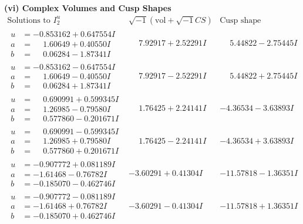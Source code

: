 \documentclass[1p]{elsarticle_modified}
\theoremstyle{definition}
\newcommand{\I}{\sqrt{-1}}
\begin{document}
\newpage\flushleft \textbf{(vi) Complex Volumes and Cusp Shapes}
$$\begin{array}{c|c|c}  
\text{Solutions to }I^u_{2}& \I (\text{vol} + \sqrt{-1}CS) & \text{Cusp shape}\\
 \hline 
\begin{aligned}
u &= -0.853162 + 0.647554 I \\
a &= \phantom{-}1.60649 + 0.40550 I \\
b &= \phantom{-}0.06284 - 1.87341 I\end{aligned}
 & \phantom{-}7.92917 + 2.52291 I & \phantom{-}5.44822 - 2.75445 I \\ \hline\begin{aligned}
u &= -0.853162 - 0.647554 I \\
a &= \phantom{-}1.60649 - 0.40550 I \\
b &= \phantom{-}0.06284 + 1.87341 I\end{aligned}
 & \phantom{-}7.92917 - 2.52291 I & \phantom{-}5.44822 + 2.75445 I \\ \hline\begin{aligned}
u &= \phantom{-}0.690991 + 0.599345 I \\
a &= \phantom{-}1.26985 - 0.79580 I \\
b &= \phantom{-}0.577860 - 0.201671 I\end{aligned}
 & \phantom{-}1.76425 + 2.24141 I & -4.36534 - 3.63893 I \\ \hline\begin{aligned}
u &= \phantom{-}0.690991 - 0.599345 I \\
a &= \phantom{-}1.26985 + 0.79580 I \\
b &= \phantom{-}0.577860 + 0.201671 I\end{aligned}
 & \phantom{-}1.76425 - 2.24141 I & -4.36534 + 3.63893 I \\ \hline\begin{aligned}
u &= -0.907772 + 0.081189 I \\
a &= -1.61468 - 0.76782 I \\
b &= -0.185070 - 0.462746 I\end{aligned}
 & -3.60291 + 0.41304 I & -11.57818 - 1.36351 I \\ \hline\begin{aligned}
u &= -0.907772 - 0.081189 I \\
a &= -1.61468 + 0.76782 I \\
b &= -0.185070 + 0.462746 I\end{aligned}
 & -3.60291 - 0.41304 I & -11.57818 + 1.36351 I \\ \hline\begin{aligned}

\end{aligned}
\end{array}$$
\end{document}

